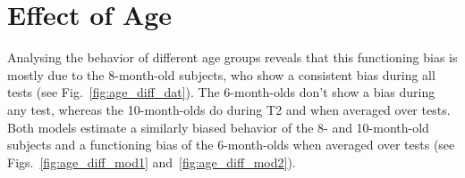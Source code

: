 \documentclass[a4paper]{scrreprt}
\begin{document}
\clearpage

\section{Effect of Age}
\label{sec:age}

Analysing the behavior of different age groups reveals that this functioning bias is mostly due to the 8-month-old subjects, who show a consistent bias during all tests (see Fig.~\ref{fig:age_diff_dat}). The 6-month-olds don't show a bias during any test, whereas the 10-month-olds do during T2 and when averaged over tests. 
Both models estimate a similarly biased behavior of the 8- and 10-month-old subjects and a functioning bias of the 6-month-olds when averaged over tests (see Figs.~\ref{fig:age_diff_mod1} and~\ref{fig:age_diff_mod2}).
\end{document}
